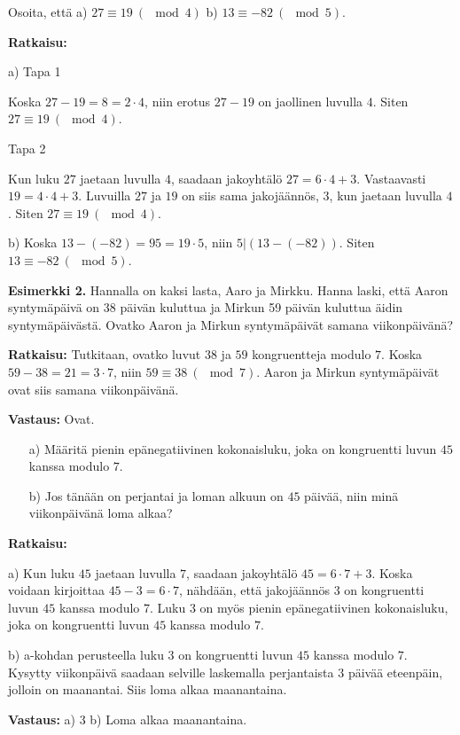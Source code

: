 \begin{esimerkki}
Osoita, että a) $27 \equiv 19 \ (\mod 4)$ b) $13 \equiv -82 \ (\mod 5)$.

{\bf Ratkaisu:}

a) Tapa 1

Koska $27 - 19 = 8 = 2\cdot 4$, niin erotus $27-19$ on jaollinen luvulla $4$. Siten $27 \equiv 19 \ (\mod 4)$.

Tapa 2

Kun luku $27$ jaetaan luvulla $4$, saadaan jakoyhtälö $27 = 6 \cdot 4 + 3$. Vastaavasti $19 = 4 \cdot 4 + 3$. Luvuilla $27$ ja $19$ on siis sama jakojäännös, $3$, kun jaetaan luvulla $4$. Siten $27 \equiv 19\ (\mod 4)$.

b) Koska $13 - (-82) = 95 = 19 \cdot 5$, niin $5 | (13 - (-82))$. Siten $13 \equiv -82 \ (\mod 5)$.


{\bf Esimerkki 2.}
Hannalla on kaksi lasta, Aaro ja Mirkku. Hanna laski, että Aaron syntymäpäivä on 38 päivän kuluttua  ja Mirkun 59 päivän kuluttua äidin syntymäpäivästä. Ovatko Aaron ja Mirkun syntymäpäivät samana viikonpäivänä?

{\bf Ratkaisu:}
Tutkitaan, ovatko luvut $38$ ja $59$ kongruentteja modulo $7$. Koska $59 - 38 = 21 = 3\cdot 7$, niin $59 \equiv 38\ (\mod 7)$. Aaron ja Mirkun syntymäpäivät ovat siis  samana viikonpäivänä.

{\bf Vastaus:} Ovat.
\end{esimerkki}

\begin{esimerkki}
\begin{itemize}
\item[a)] Määritä pienin epänegatiivinen kokonaisluku, joka on kongruentti luvun $45$ kanssa modulo $7$.
\item[b)] Jos tänään on perjantai ja loman alkuun on $45$ päivää, niin minä viikonpäivänä loma alkaa?
\end{itemize}

{\bf Ratkaisu:}

a)
Kun luku $45$ jaetaan luvulla $7$, saadaan jakoyhtälö $45 = 6 \cdot 7 + 3$. Koska voidaan kirjoittaa $45 - 3 = 6 \cdot 7$, nähdään, että jakojäännös $3$ on kongruentti luvun $45$ kanssa modulo 7. Luku $3$ on myös pienin epänegatiivinen kokonaisluku, joka on kongruentti luvun $45$ kanssa modulo $7$.

b)
a-kohdan perusteella luku $3$ on kongruentti luvun $45$ kanssa modulo $7$. Kysytty viikonpäivä saadaan selville laskemalla perjantaista $3$ päivää eteenpäin, jolloin on maanantai. Siis loma alkaa maanantaina. 

{\bf Vastaus:} a) 3 b) Loma alkaa maanantaina.
\end{esimerkki}

